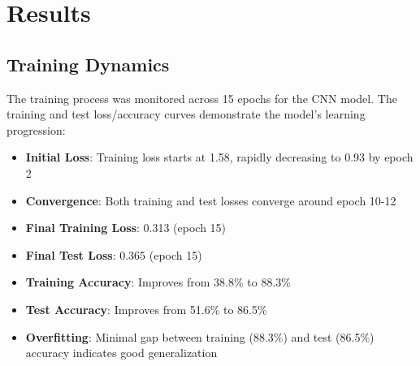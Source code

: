 \documentclass[runningheads]{llncs}
\begin{document}


\section{Results}

\subsection{Training Dynamics}

The training process was monitored across 15 epochs for the CNN model. The training and test loss/accuracy curves demonstrate the model's learning progression:

\begin{itemize}
    \item \textbf{Initial Loss}: Training loss starts at 1.58, rapidly decreasing to 0.93 by epoch 2
    \item \textbf{Convergence}: Both training and test losses converge around epoch 10-12
    \item \textbf{Final Training Loss}: 0.313 (epoch 15)
    \item \textbf{Final Test Loss}: 0.365 (epoch 15)
    \item \textbf{Training Accuracy}: Improves from 38.8\% to 88.3\%
    \item \textbf{Test Accuracy}: Improves from 51.6\% to 86.5\%
    \item \textbf{Overfitting}: Minimal gap between training (88.3\%) and test (86.5\%) accuracy indicates good generalization
\end{itemize}
\end{document}
